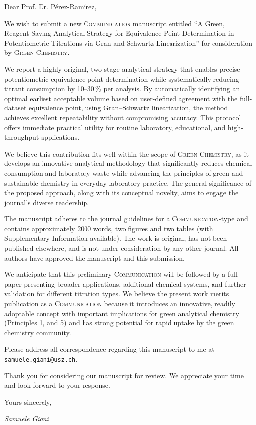 \documentclass[a4paper,english,10pt]{letter}
\begin{document}
\indent
{\setlength{\baselineskip}{1.35\baselineskip} %

\noindent Dear Prof. Dr. Pérez-Ramírez,

We wish to submit a new \textsc{Communication} manuscript entitled ``A Green, Reagent-Saving Analytical Strategy for Equivalence Point Determination in Potentiometric Titrations via Gran and Schwartz Linearization''  for consideration by \textsc{Green Chemistry}.

We report a highly original, two-stage analytical strategy that enables precise potentiometric equivalence point determination while systematically reducing titrant consumption by 10–30\,\% per analysis. By automatically identifying an optimal earliest acceptable volume based on user-defined agreement with the full-dataset equivalence point, using Gran–Schwartz linearization, the method achieves excellent repeatability without compromising accuracy. This protocol offers immediate practical utility for routine laboratory, educational, and high-throughput applications.

We believe this contribution fits well within the scope of \textsc{Green Chemistry}, as it develops an innovative analytical methodology that significantly reduces chemical consumption and laboratory waste while advancing the principles of green and sustainable chemistry in everyday laboratory practice. The general significance of the proposed approach, along with its conceptual novelty, aims to engage the journal’s diverse readership.

The manuscript adheres to the journal guidelines for a \textsc{Communication}-type and contains approximately 2000 words, two figures and two tables (with Supplementary Information available). The work is original, has not been published elsewhere, and is not under consideration by any other journal. All authors have approved the manuscript and this submission.

We anticipate that this preliminary \textsc{Communication} will be followed by a full paper presenting broader applications, additional chemical systems, and further validation for different titration types. We believe the present work merits publication as a \textsc{Communication} because it introduces an innovative, readily adoptable concept with important implications for green analytical chemistry (Principles 1, and 5) and has strong potential for rapid uptake by the green chemistry community.

Please address all correspondence regarding this manuscript to me at \texttt{samuele.giani@usz.ch}.

Thank you for considering our manuscript for review. We appreciate your time and look forward to your response.

\vspace{1cm}
\noindent Yours sincerely,

\par} %

\begin{flushright}
{\it Samuele Giani} \hspace{2.5cm} \rule{0pt}{0pt}
\end{flushright}

\end{document}
